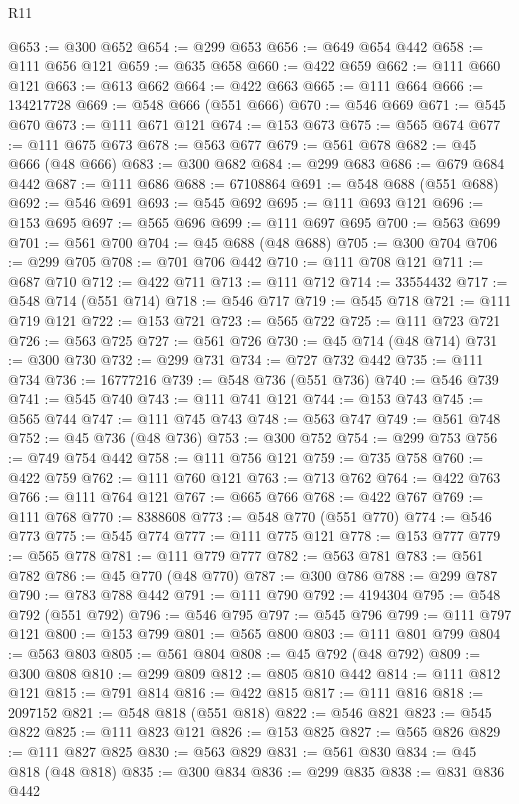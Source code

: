 \begin{lexlean}{R11}
\begin{coremodule}
@653 := @300 @652
@654 := @299 @653
@656 := @649 @654 @442
@658 := @111 @656 @121
@659 := @635 @658
@660 := @422 @659
@662 := @111 @660 @121
@663 := @613 @662
@664 := @422 @663
@665 := @111 @664
@666 := 134217728
@669 := @548 @666 (@551 @666)
@670 := @546 @669
@671 := @545 @670
@673 := @111 @671 @121
@674 := @153 @673
@675 := @565 @674
@677 := @111 @675 @673
@678 := @563 @677
@679 := @561 @678
@682 := @45 @666 (@48 @666)
@683 := @300 @682
@684 := @299 @683
@686 := @679 @684 @442
@687 := @111 @686
@688 := 67108864
@691 := @548 @688 (@551 @688)
@692 := @546 @691
@693 := @545 @692
@695 := @111 @693 @121
@696 := @153 @695
@697 := @565 @696
@699 := @111 @697 @695
@700 := @563 @699
@701 := @561 @700
@704 := @45 @688 (@48 @688)
@705 := @300 @704
@706 := @299 @705
@708 := @701 @706 @442
@710 := @111 @708 @121
@711 := @687 @710
@712 := @422 @711
@713 := @111 @712
@714 := 33554432
@717 := @548 @714 (@551 @714)
@718 := @546 @717
@719 := @545 @718
@721 := @111 @719 @121
@722 := @153 @721
@723 := @565 @722
@725 := @111 @723 @721
@726 := @563 @725
@727 := @561 @726
@730 := @45 @714 (@48 @714)
@731 := @300 @730
@732 := @299 @731
@734 := @727 @732 @442
@735 := @111 @734
@736 := 16777216
@739 := @548 @736 (@551 @736)
@740 := @546 @739
@741 := @545 @740
@743 := @111 @741 @121
@744 := @153 @743
@745 := @565 @744
@747 := @111 @745 @743
@748 := @563 @747
@749 := @561 @748
@752 := @45 @736 (@48 @736)
@753 := @300 @752
@754 := @299 @753
@756 := @749 @754 @442
@758 := @111 @756 @121
@759 := @735 @758
@760 := @422 @759
@762 := @111 @760 @121
@763 := @713 @762
@764 := @422 @763
@766 := @111 @764 @121
@767 := @665 @766
@768 := @422 @767
@769 := @111 @768
@770 := 8388608
@773 := @548 @770 (@551 @770)
@774 := @546 @773
@775 := @545 @774
@777 := @111 @775 @121
@778 := @153 @777
@779 := @565 @778
@781 := @111 @779 @777
@782 := @563 @781
@783 := @561 @782
@786 := @45 @770 (@48 @770)
@787 := @300 @786
@788 := @299 @787
@790 := @783 @788 @442
@791 := @111 @790
@792 := 4194304
@795 := @548 @792 (@551 @792)
@796 := @546 @795
@797 := @545 @796
@799 := @111 @797 @121
@800 := @153 @799
@801 := @565 @800
@803 := @111 @801 @799
@804 := @563 @803
@805 := @561 @804
@808 := @45 @792 (@48 @792)
@809 := @300 @808
@810 := @299 @809
@812 := @805 @810 @442
@814 := @111 @812 @121
@815 := @791 @814
@816 := @422 @815
@817 := @111 @816
@818 := 2097152
@821 := @548 @818 (@551 @818)
@822 := @546 @821
@823 := @545 @822
@825 := @111 @823 @121
@826 := @153 @825
@827 := @565 @826
@829 := @111 @827 @825
@830 := @563 @829
@831 := @561 @830
@834 := @45 @818 (@48 @818)
@835 := @300 @834
@836 := @299 @835
@838 := @831 @836 @442

\end{coremodule}
\end{lexlean}
